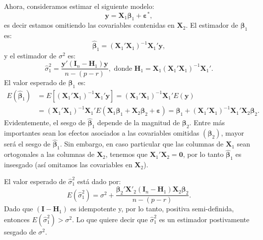 \documentclass[
]{article}
\begin{document}
Ahora, consideramos estimar el siguiente modelo:
\[
\boldsymbol y= \boldsymbol X_{1}\boldsymbol \beta_{1} + \boldsymbol \varepsilon^{*},
\]
es decir estamos omitiendo las covariables contenidas en \(\boldsymbol X_{2}\). El estimador de \(\boldsymbol \beta_{1}\) es:
\[
\widehat{\boldsymbol \beta}_{1} = (\boldsymbol X_{1}'\boldsymbol X_{1})^{-1}\boldsymbol X_{1}'\boldsymbol y,
\]
y el estimador de \(\sigma^{2}\) es:
\[
\widehat{\sigma}^{2}_{1} = \frac{\boldsymbol y'(\boldsymbol I_{n} - \boldsymbol H_{1})\boldsymbol y}{n-(p-r)}, \mbox{ donde }\boldsymbol H_{1} = \boldsymbol X_{1}(\boldsymbol X_{1}'\boldsymbol X_{1})^{-1}\boldsymbol X_{1}'.
\]
El valor esperado de \(\widehat{\boldsymbol \beta}_{1}\) es:
\begin{equation}
\begin{split}
E(\widehat{\boldsymbol \beta}_{1}) &= E\left[(\boldsymbol X_{1}'\boldsymbol X_{1})^{-1}\boldsymbol X_{1}'\boldsymbol y\right] = (\boldsymbol X_{1}'\boldsymbol X_{1})^{-1}\boldsymbol X_{1}'E(\boldsymbol y) \\
&= (\boldsymbol X_{1}'\boldsymbol X_{1})^{-1}\boldsymbol X_{1}'E(\boldsymbol X_{1}\boldsymbol \beta_{1} + \boldsymbol X_{2}\boldsymbol \beta_{2} + \boldsymbol \varepsilon) = \boldsymbol \beta_{1} +  (\boldsymbol X_{1}'\boldsymbol X_{1})^{-1}\boldsymbol X_{1}'\boldsymbol X_{2}\boldsymbol \beta_{2}.
\end{split}
\nonumber
\end{equation}
Evidentemente, el sesgo de \(\widehat{\boldsymbol \beta}_{1}\) depende de la magnitud de \(\boldsymbol \beta_{2}\). Entre más importantes sean los efectos asociados a las covariables omitidas \((\boldsymbol \beta_{2})\), mayor será el sesgo de \(\widehat{\boldsymbol \beta}_1\). Sin embargo, en caso particular que las columnas de \(\boldsymbol X_{1}\) sean ortogonales a las columnas de \(\boldsymbol X_{2}\), tenemos que \(\boldsymbol X_{1}'\boldsymbol X_{2} = \boldsymbol 0\), por lo tanto \(\widehat{\boldsymbol \beta}_{1}\) es insesgado (así omitamos las covariables en \(\boldsymbol X_{2}\)).

El valor esperado de \(\widehat{\sigma}^{2}_{1}\) está dado por:
\[
E(\widehat{\sigma}^{2}_{1}) = \sigma^{2} + \frac{\boldsymbol \beta_{2}'\boldsymbol X'_{2}(\boldsymbol I_{n} - \boldsymbol H_{1})\boldsymbol X_{2}\boldsymbol \beta_{2}}{n-(p-r)}.
\]
Dado que \((\boldsymbol I- \boldsymbol H_{1})\) es idempotente y, por lo tanto, positiva semi-definida, entonces \(E(\widehat{\sigma}_{1}^{2}) > \sigma^{2}\). Lo que quiere decir que \(\widehat{\sigma}^{2}_{1}\) es un estimador postivamente sesgado de \(\sigma^{2}\).
\end{document}
